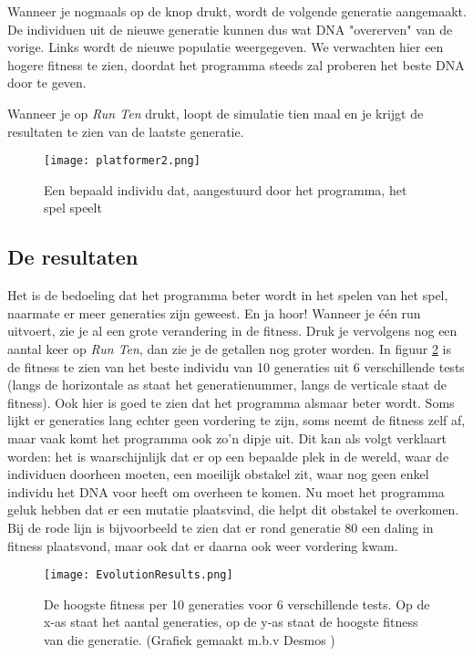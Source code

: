 Wanneer je nogmaals op de knop drukt, wordt de volgende generatie aangemaakt. De individuen uit de nieuwe generatie kunnen dus wat DNA "overerven" van de vorige. Links wordt de nieuwe populatie weergegeven. We verwachten hier een hogere fitness te zien, doordat het programma steeds zal proberen het beste DNA door te geven.

Wanneer je op \textit{Run Ten} drukt, loopt de simulatie tien maal en je krijgt de resultaten te zien van de laatste generatie.


\begin{figure}[H]
  \centering
    \texttt{[image: platformer2.png]}
  \caption{Een bepaald individu dat, aangestuurd door het programma, het spel speelt}
  \label{fig:platformer1}
\end{figure}

\subsection{De resultaten}
Het is de bedoeling dat het programma beter wordt in het spelen van het spel, naarmate er meer generaties zijn geweest. En ja hoor! Wanneer je \'e\'en run uitvoert, zie je al een grote verandering in de fitness. Druk je vervolgens nog een aantal keer op \textit{Run Ten}, dan zie je de getallen nog groter worden. In figuur \ref{fig:EvolutionResults} is de fitness te zien van het beste individu van 10 generaties uit 6 verschillende tests (langs de horizontale as staat het generatienummer, langs de verticale staat de fitness). Ook hier is goed te zien dat het programma alsmaar beter wordt. Soms lijkt er generaties lang echter geen vordering te zijn, soms neemt de fitness zelf af, maar vaak komt het programma ook zo'n dipje uit. Dit kan als volgt verklaart worden: het is waarschijnlijk dat er op een bepaalde plek in de wereld, waar de individuen doorheen moeten, een moeilijk obstakel zit, waar nog geen enkel individu het DNA voor heeft om overheen te komen. Nu moet het programma geluk hebben dat er een mutatie plaatsvind, die helpt dit obstakel te overkomen. Bij de rode lijn is bijvoorbeeld te zien dat er rond generatie 80 een daling in fitness plaatsvond, maar ook dat er daarna ook weer vordering kwam.

\begin{figure}[H]
  \centering
    \texttt{[image: EvolutionResults.png]}
  \caption{De hoogste fitness per 10 generaties voor 6 verschillende tests. Op de x-as staat het aantal generaties, op de y-as staat de hoogste fitness van die generatie. (Grafiek gemaakt m.b.v Desmos \cite{Desmos})}
  \label{fig:EvolutionResults}
\end{figure}

